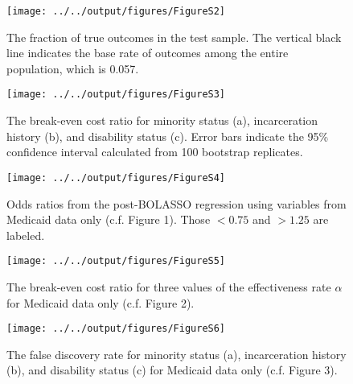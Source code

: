 \documentclass[9pt,twoside]{pnas-new}
\begin{document}
\begin{figure}
\caption{The fraction of true outcomes in the test sample. The vertical black line indicates the base rate of outcomes among the entire population, which is 0.057.}
\centering
\texttt{[image: ../../output/figures/FigureS2]}
\end{figure}

\begin{figure}
\caption{The break-even cost ratio for minority status (a), incarceration history (b), and disability status (c). Error bars indicate the 95\% confidence interval calculated from 100 bootstrap replicates.}
\centering
\texttt{[image: ../../output/figures/FigureS3]}
\end{figure}

\begin{figure}
\caption{Odds ratios from the post-BOLASSO regression using variables from Medicaid data only (c.f. Figure 1). Those $<0.75$ and $>1.25$ are labeled.}
\centering
\texttt{[image: ../../output/figures/FigureS4]}
\end{figure}

\begin{figure}
\caption{The break-even cost ratio for three values of the effectiveness rate $\alpha$ for Medicaid data only (c.f. Figure 2).}
\centering
\texttt{[image: ../../output/figures/FigureS5]}
\end{figure}

\begin{figure}
\caption{The false discovery rate for minority status (a), incarceration history (b), and disability status (c) for Medicaid data only (c.f. Figure 3).}
\centering
\texttt{[image: ../../output/figures/FigureS6]}
\end{figure}
\end{document}
